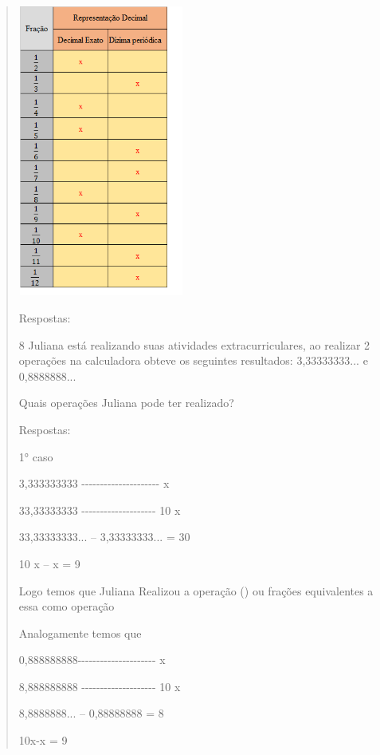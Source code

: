 \begin{quote}

\includegraphics[width=2.14722in,height=3.775in]{./imgSAEB_8_MAT/media/image4.png}

Respostas:

\num{8} Juliana está realizando suas atividades extracurriculares, ao
realizar 2 operações na calculadora obteve os seguintes resultados:
3,33333333... e 0,8888888...

Quais operações Juliana pode ter realizado?


Respostas:

1° caso

3,333333333
-\/-\/-\/-\/-\/-\/-\/-\/-\/-\/-\/-\/-\/-\/-\/-\/-\/-\/-\/-\/- x

33,33333333 -\/-\/-\/-\/-\/-\/-\/-\/-\/-\/-\/-\/-\/-\/-\/-\/-\/-\/-\/-
10 x

33,33333333... -- 3,33333333... = 30

10 x -- x = 9

Logo temos que Juliana Realizou a operação () ou frações
equivalentes a essa como operação

Analogamente temos que

0,888888888-\/-\/-\/-\/-\/-\/-\/-\/-\/-\/-\/-\/-\/-\/-\/-\/-\/-\/-\/-\/-
x

8,888888888 -\/-\/-\/-\/-\/-\/-\/-\/-\/-\/-\/-\/-\/-\/-\/-\/-\/-\/-\/-
10 x

8,8888888... -- 0,88888888 = 8

10x-x = 9


\end{quote}
